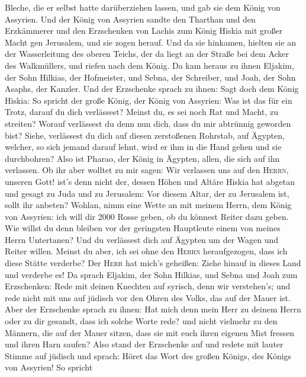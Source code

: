 Bleche, die er selbst hatte darüberziehen lassen, und gab sie dem König
von Assyrien.  Und der König von Assyrien sandte den
Tharthan und den Erzkämmerer und den Erzschenken von Lachis zum König
Hiskia mit großer Macht gen Jerusalem, und sie zogen herauf. Und da sie
hinkamen, hielten sie an der Wasserleitung des oberen Teichs, der da
liegt an der Straße bei dem Acker des Walkmüllers,  und
riefen nach dem König. Da kam heraus zu ihnen Eljakim, der Sohn Hilkias,
der Hofmeister, und Sebna, der Schreiber, und Joah, der Sohn Asaphs, der
Kanzler.  Und der Erzschenke sprach zu ihnen: Sagt doch
dem König Hiskia: So spricht der große König, der König von Assyrien:
Was ist das für ein Trotz, darauf du dich verlässest? 
Meinst du, es sei noch Rat und Macht, zu streiten? Worauf verlässest du
denn nun dich, dass du mir abtrünnig geworden bist? 
Siehe, verlässest du dich auf diesen zerstoßenen Rohrstab, auf Ägypten,
welcher, so sich jemand darauf lehnt, wird er ihm in die Hand gehen und
sie durchbohren? Also ist Pharao, der König in Ägypten, allen, die sich
auf ihn verlassen.  Ob ihr aber wolltet zu mir sagen: Wir
verlassen uns auf den \textsc{Herrn}, unseren Gott! ist's denn nicht
der, dessen Höhen und Altäre Hiskia hat abgetan und gesagt zu Juda und
zu Jerusalem: Vor diesem Altar, der zu Jerusalem ist, sollt ihr anbeten?
 Wohlan, nimm eine Wette an mit meinem Herrn, dem König
von Assyrien: ich will dir 2000 Rosse geben, ob du könnest Reiter dazu
geben.  Wie willst du denn bleiben vor der geringsten
Hauptleute einem von meines Herrn Untertanen? Und du verlässest dich auf
Ägypten um der Wagen und Reiter willen.  Meinst du aber,
ich sei ohne den \textsc{Herrn} heraufgezogen, dass ich diese Stätte
verderbe? Der \textsc{Herr} hat mich's geheißen: Ziehe hinauf in dieses
Land und verderbe es!  Da sprach Eljakim, der Sohn
Hilkias, und Sebna und Joah zum Erzschenken: Rede mit deinen Knechten
auf syrisch, denn wir verstehen's; und rede nicht mit uns auf jüdisch
vor den Ohren des Volks, das auf der Mauer ist.  Aber der
Erzschenke sprach zu ihnen: Hat mich denn mein Herr zu deinem Herrn oder
zu dir gesandt, dass ich solche Worte rede? und nicht vielmehr zu den
Männern, die auf der Mauer sitzen, dass sie mit euch ihren eigenen Mist
fressen und ihren Harn saufen?  Also stand der Erzschenke
auf und redete mit lauter Stimme auf jüdisch und sprach: Höret das Wort
des großen Königs, des Königs von Assyrien!  So spricht
